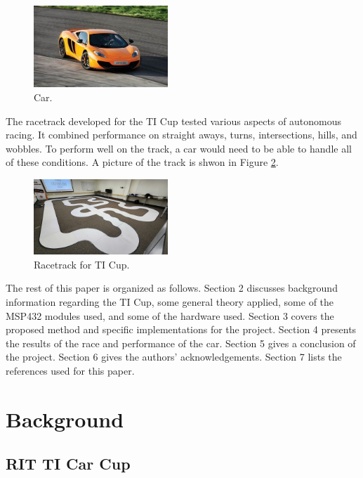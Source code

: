\documentclass[conference]{IEEEtran}
\begin{document}
\begin{figure}[htbp]
	\centerline{\includegraphics[width=0.45\textwidth]{images/car.jpg}}
	\caption{Car.}
	\label{fig:car}
\end{figure}

The racetrack developed for the TI Cup tested various aspects of autonomous racing. It combined performance on straight aways, turns, intersections, hills, and wobbles. To perform well on the track, a car would need to be able to handle all of these conditions. A picture of the track is shwon in Figure \ref{fig:track}.

\begin{figure}[htbp]
	\centerline{\includegraphics[width=0.45\textwidth]{images/track.jpg}}
	\caption{Racetrack for TI Cup.}
	\label{fig:track}
\end{figure}

The rest of this paper is organized as follows. Section 2 discusses background information regarding the TI Cup, some general theory applied, some of the MSP432 modules used, and some of the hardware used. Section 3 covers the proposed method and specific implementations for the project. Section 4 presents the results of the race and performance of the car. Section 5 gives a conclusion of the project. Section 6 gives the authors' acknowledgements. Section 7 lists the references used for this paper.

\section{Background}

\subsection{RIT TI Car Cup}
\end{document}
